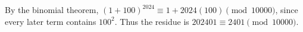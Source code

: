 By the binomial theorem, $(1+100)^{2024}\equiv1+2024(100)\pmod{10000}$, since every later term contains $100^2$. Thus the residue is $202401\equiv\boxed{2401}\pmod{10000}$.
